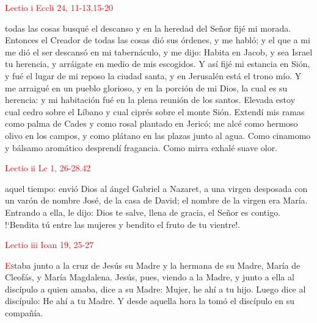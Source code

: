 \noindent\textcolor{red}{Lectio i \hfill Eccli 24, 11-13.15-20}

todas las cosas busqué el descanso y en la heredad del Señor fijé mi morada. Entonces el Creador de todas las cosas dió sus órdenes, y me habló; y el que a mi me dió el ser
descansó en mi tabernáculo, y me dijo: Habita en Jacob, y sea Israel tu herencia, y arráigate en medio de mis escogidos. Y así fijé mi estancia en Sión, y fué el lugar de mi reposo
la ciudad santa, y en Jerusalén está el trono mío. Y me arraigué en un pueblo glorioso, y en la porción de mi Dios, la cual es su herencia: y mi habitación fué en la plena reunión
de los santos. Elevada estoy cual cedro sobre el Líbano y cual ciprés sobre el monte Sión. Extendí mis ramas como palma de Cades y como rosal plantado en Jericó; me alcé como hermoso
olivo en los campos, y como plátano en las plazas junto al agua. Como cinamomo y bálsamo aromático desprendí fragancia. Como mirra exhalé suave olor.

\vspace{0.5em}

\noindent\textcolor{red}{Lectio ii \hfill Lc 1, 26-28.42}

aquel tiempo: envió Dios al ángel Gabriel a Nazaret, a una virgen desposada con un varón de nombre José, de la casa de David; el nombre de la virgen era María. 
Entrando a ella, le dijo: Dios te salve, llena de gracia, el Señor es contigo. {!`}Bendita tú entre las mujeres y bendito el fruto de tu vientre!.

\vspace{0.5em}

\noindent\textcolor{red}{Lectio iii \hfill Ioan 19, 25-27}

\lettrine[lines=2]{\textcolor{red}{E}}staba junto a la cruz de Jesús su Madre y la hermana de su Madre, María de Cleofás, y María Magdalena. Jesús, pues, viendo a la Madre, y junto a ella
al discípulo a quien amaba, dice a su Madre: Mujer, he ahí a tu hijo. Luego dice al discípulo: He ahí a tu Madre. Y desde aquella hora la tomó el discípulo en su compañía.

\vspace{2mm}

